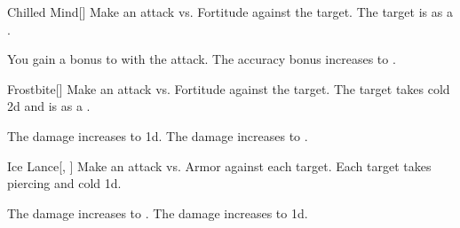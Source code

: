 \lowercase{\hypertarget{spell:Chilled Mind}{}}\label{spell:Chilled Mind}
\begin{freeability}[Rank 3]{\hypertarget{spell:Chilled Mind}{Chilled Mind}}[]
Make an attack vs. Fortitude against the target.
\hit The target is  as a .

\rankline
{} You gain a  bonus to  with the attack.
 The accuracy bonus increases to .
\end{freeability}
\vspace{0.25em}



\lowercase{\hypertarget{spell:Frostbite}{}}\label{spell:Frostbite}
\begin{freeability}[Rank 3]{\hypertarget{spell:Frostbite}{Frostbite}}[]
Make an attack vs. Fortitude against the target.
\hit The target takes cold  \minus2d and is  as a .

\rankline
{} The damage increases to  \minus1d.
 The damage increases to .
\end{freeability}
\vspace{0.25em}



\lowercase{\hypertarget{spell:Ice Lance}{}}\label{spell:Ice Lance}
\begin{freeability}[Rank 3]{\hypertarget{spell:Ice Lance}{Ice Lance}}[, ]
Make an attack vs. Armor against each target.
\hit Each target takes piercing and cold  \minus1d.

\rankline
{} The damage increases to .
 The damage increases to  \plus1d.
\end{freeability}
\vspace{0.25em}




